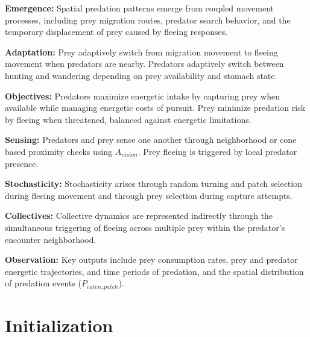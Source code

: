 \documentclass[
]{book}
\begin{document}
\textbf{Emergence:} Spatial predation patterns emerge from coupled movement
processes, including prey migration routes, predator search behavior,
and the temporary displacement of prey caused by fleeing responses.

\textbf{Adaptation:} Prey adaptively switch from migration movement to
fleeing movement when predators are nearby. Predators adaptively switch
between hunting and wandering depending on prey availability and stomach
state.

\textbf{Objectives:} Predators maximize energetic intake by capturing prey
when available while managing energetic costs of pursuit. Prey minimize
predation risk by fleeing when threatened, balanced against energetic
limitations.

\textbf{Sensing:} Predators and prey sense one another through neighborhood
or cone based proximity checks using \(A_{vision}\). Prey fleeing is
triggered by local predator presence.

\textbf{Stochasticity:} Stochasticity arises through random turning and patch
selection during fleeing movement and through prey selection during
capture attempts.

\textbf{Collectives:} Collective dynamics are represented indirectly through
the simultaneous triggering of fleeing across multiple prey within the
predator's encounter neighborhood.

\textbf{Observation:} Key outputs include prey consumption rates, prey and
predator energetic trajectories, and time periods of predation, and the
spatial distribution of predation events (\(P_{eaten,patch}\)).

\section{Initialization}\label{initialization-11}
\end{document}
